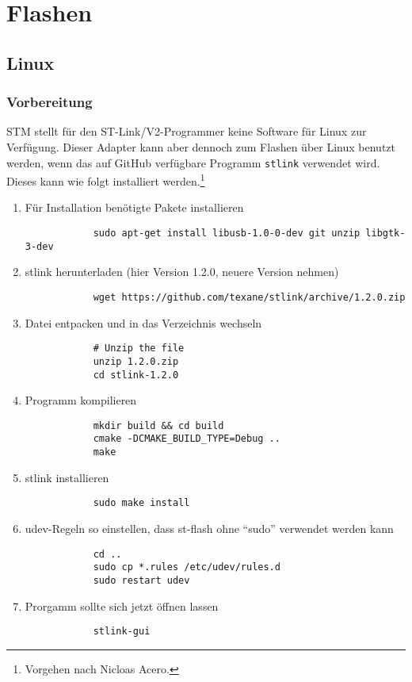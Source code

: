 

\chapter{Flashen}


\section{Linux}

\subsection{Vorbereitung}

STM stellt für den ST-Link/V2-Programmer keine Software für Linux zur Verfügung. Dieser Adapter kann aber dennoch zum Flashen über Linux benutzt werden, wenn das auf GitHub verfügbare Programm \texttt{stlink} verwendet wird. Dieses kann wie folgt installiert werden.\footnote{Vorgehen nach Nicloas Acero.}

\begin{enumerate}
	\item Für Installation benötigte Pakete installieren
		\begin{verbatim}
			sudo apt-get install libusb-1.0-0-dev git unzip libgtk-3-dev
		\end{verbatim}
	\item stlink herunterladen (hier Version 1.2.0, \ggf neuere Version nehmen)
		\begin{verbatim}
			wget https://github.com/texane/stlink/archive/1.2.0.zip
		\end{verbatim}
	\item Datei entpacken und in das Verzeichnis wechseln
		\begin{verbatim}
			# Unzip the file
			unzip 1.2.0.zip
			cd stlink-1.2.0
		\end{verbatim}
	\item Programm kompilieren
		\begin{verbatim}
			mkdir build && cd build
			cmake -DCMAKE_BUILD_TYPE=Debug ..
			make		
		\end{verbatim}
	\item stlink installieren
		\begin{verbatim}
			sudo make install
		\end{verbatim}
	\item udev-Regeln so einstellen, dass st-flash ohne "`sudo"' verwendet werden kann
		\begin{verbatim}
			cd ..
			sudo cp *.rules /etc/udev/rules.d
			sudo restart udev
		\end{verbatim}
	\item Prorgamm sollte sich jetzt öffnen lassen
		\begin{verbatim}
			stlink-gui
		\end{verbatim}
\end{enumerate}


